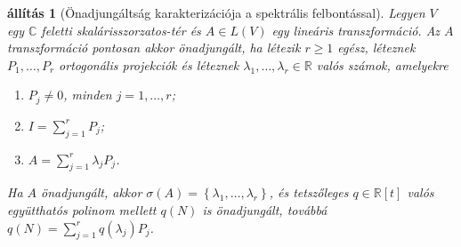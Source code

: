 \documentclass[9pt, a4paper, showtrims]{memoir}
\theoremstyle{plain}
\newtheorem{proposition}{állítás}[chapter]
\theoremstyle{remark}
\theoremstyle{definition}
\begin{document}
\begin{proposition}[Önadjungáltság karakterizációja a spektrális felbontással]
	Legyen $V$ egy $\mathbb{C}$ feletti ska\-lá\-ris\-szor\-za\-tos-tér és $A\in L\left( V \right)$ egy lineáris transzformáció.
	Az $A$ transzformáció pontosan akkor önadjungált,
	ha létezik $r\geq 1$ egész, léteznek $P_1,\ldots,P_r$ ortogonális projekciók és
	léteznek $\lambda_1,\ldots,\lambda_r\in\mathbb{R}$ valós számok,
	amelyekre
	\begin{enumerate}
		\item $P_j\neq 0$, minden $j=1,\ldots,r$;
		\item $I=\sum_{j=1}^rP_j$;
		\item $A=\sum_{j=1}^r\lambda_jP_j$.
	\end{enumerate}
	Ha $A$ önadjungált,
	akkor $\sigma\left( A \right)=\left\{ \lambda_1,\ldots,\lambda_r \right\}$,
	és tetszőleges $q\in\mathbb{R}[t]$ valós együtthatós polinom mellett
	$q\left( N \right)$ is önadjungált,
	továbbá
	$q\left( N \right)=\sum_{j=1}^rq\left( \lambda_j \right)P_j$.
\end{proposition}
\end{document}
